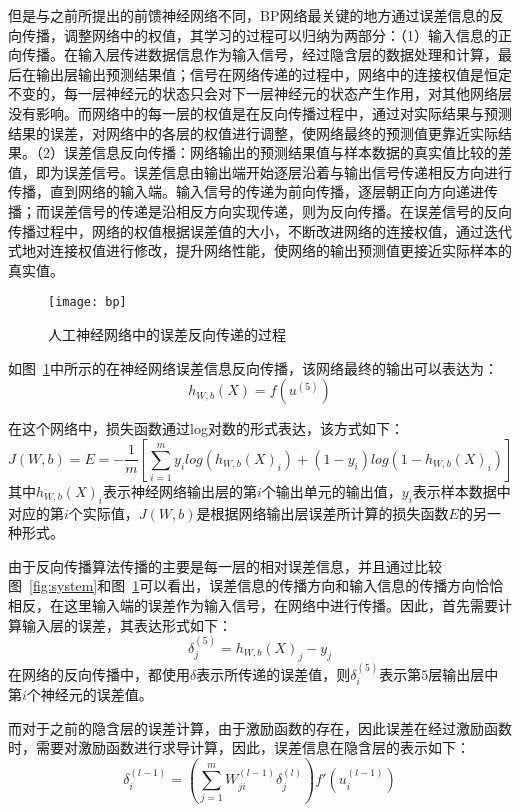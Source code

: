 但是与之前所提出的前馈神经网络不同，BP网络最关键的地方通过误差信息的反向传播，调整网络中的权值，其学习的过程可以归纳为两部分：（1）输入信息的正向传播。在输入层传进数据信息作为输入信号，经过隐含层的数据处理和计算，最后在输出层输出预测结果值；信号在网络传递的过程中，网络中的连接权值是恒定不变的，每一层神经元的状态只会对下一层神经元的状态产生作用，对其他网络层没有影响。而网络中的每一层的权值是在反向传播过程中，通过对实际结果与预测结果的误差，对网络中的各层的权值进行调整，使网络最终的预测值更靠近实际结果。（2）误差信息反向传播：网络输出的预测结果值与样本数据的真实值比较的差值，即为误差信号。误差信息由输出端开始逐层沿着与输出信号传递相反方向进行传播，直到网络的输入端。输入信号的传递为前向传播，逐层朝正向方向递进传播；而误差信号的传递是沿相反方向实现传递，则为反向传播。在误差信号的反向传播过程中，网络的权值根据误差值的大小，不断改进网络的连接权值，通过迭代式地对连接权值进行修改，提升网络性能，使网络的输出预测值更接近实际样本的真实值。

\begin{figure}[H] %
  \centering
  \texttt{[image: bp]}
  \caption{人工神经网络中的误差反向传递的过程}
  \label{fig:bp}
\end{figure}

如图~\ref{fig:bp}中所示的在神经网络误差信息反向传播，该网络最终的输出可以表达为：
\begin{equation}
h_{W,b}(X)=f(u^{(5)})
\end{equation}

在这个网络中，损失函数通过log对数的形式表达，该方式如下：
\begin{equation}
J(W,b)=E=-\frac{1}{m}[\sum_{i=1}^{m} y_{i} log(h_{W,b}(X)_{i}) +
		(1-y_{i})log(1-h_{W,b}(X)_{i})]
\end{equation}
其中$h_{W,b}(X)_{i}$表示神经网络输出层的第$i$个输出单元的输出值，$y_{i}$表示样本数据中对应的第$i$个实际值，$J(W,b)$是根据网络输出层误差所计算的损失函数$E$的另一种形式。

由于反向传播算法传播的主要是每一层的相对误差信息，并且通过比较图~\ref{fig:system}和图~\ref{fig:bp}可以看出，误差信息的传播方向和输入信息的传播方向恰恰相反，在这里输入端的误差作为输入信号，在网络中进行传播。因此，首先需要计算输入层的误差，其表达形式如下：
\begin{equation}
\delta_{j}^{(5)}=h_{W,b}(X)_{j}-y_{j}
\end{equation}
在网络的反向传播中，都使用$\delta$表示所传递的误差值，则$\delta_{i}^{(5)}$表示第$5$层输出层中第$i$个神经元的误差值。

而对于之前的隐含层的误差计算，由于激励函数的存在，因此误差在经过激励函数时，需要对激励函数进行求导计算，因此，误差信息在隐含层的表示如下：
\begin{equation}
\delta_{i}^{(l-1)}=(\sum_{j=1}^{m} W_{ji}^{(l-1)} \delta_{j}^{(l)}) f'(u_{i}^{(l-1)})
\end{equation}

